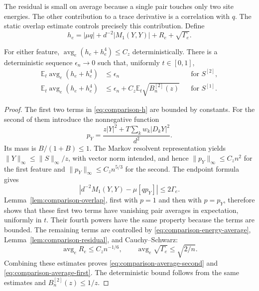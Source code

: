 The residual is small on average because a single pair touches only two
site energies.  The other contribution to a trace derivative is a correlation
with $q$.  The static overlap estimate controls precisely this contribution.
Define
\begin{equation}\label{eq:comparison-h}
 h_e=|\mu q|+d^{-2}|M_1(Y,Y)|+R_e+\sqrt{\Gamma_e}.
\end{equation}

\begin{lemma}\label{lem:comparison-average}
For either feature, $\operatorname{avg}_e(h_e+h_e^4)\le C_z$
deterministically.  There is a deterministic sequence $\epsilon_n\to0$
such that, uniformly $t\in[0,1]$,
\begin{align}
 \mathbb E_t\operatorname{avg}_e(h_e+h_e^4)&\le\epsilon_n
       &&\text{for }S^{[2]},\label{eq:comparison-average-second}\\
 \mathbb E_t\operatorname{avg}_e(h_e+h_e^4)&\le\epsilon_n+
             C_z\mathbb E_t\sqrt{B_n^{[2]}(z)}
       &&\text{for }S^{[1]}.
       \label{eq:comparison-average-first}
\end{align}
\end{lemma}

\begin{proof}
The first two terms in \eqref{eq:comparison-h} are bounded by constants.
For the second of them introduce the nonnegative function
\[
 p_Y=\frac{z|Y|^2+T\sum_k w_k|D_kY|^2}{d^2}.
\]
Its mass is $B/(1+B)\le1$.  The Markov resolvent representation yields
$\|Y\|_\infty\le\|S\|_\infty/z$, with vector norm intended, and hence
$\|p_Y\|_\infty\le C_z n^2$ for the first feature and
$\|p_Y\|_\infty\le C_z n^{5/3}$ for the second.  The endpoint formula gives
\[
 \left|d^{-2}M_1(Y,Y)-\mu[qp_Y]\right|\le2\Gamma_e.
\]
Lemma~\ref{lem:comparison-overlap}, first with $p=1$ and then with $p=p_Y$,
therefore shows that these first two terms have vanishing pair averages in
expectation, uniformly in $t$.  Their fourth powers have the same property
because the terms are bounded.  The remaining terms are controlled by
\eqref{eq:comparison-energy-average},
Lemma~\ref{lem:comparison-residual}, and Cauchy--Schwarz:
\[
 \operatorname{avg}_e R_e\le C_z n^{-1/6},\qquad
 \operatorname{avg}_e\sqrt{\Gamma_e}\le\sqrt{2/n}.
\]
Combining these estimates proves \eqref{eq:comparison-average-second} and
\eqref{eq:comparison-average-first}.  The deterministic bound follows from
the same estimates and $B_n^{[2]}(z)\le1/z$.
\end{proof}

